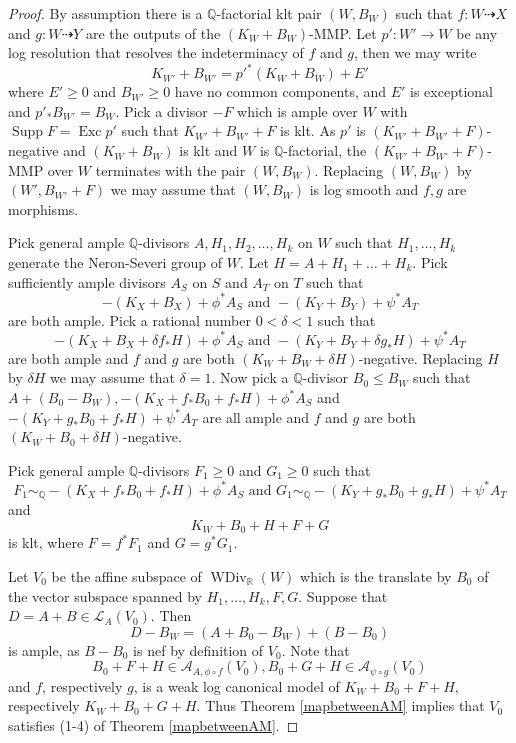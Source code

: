 \documentclass[11pt]{amsart}
\begin{document}
\begin{proof}
  By assumption there is a $\mathbb{Q}$-factorial klt pair $(W,B_{W})$ such that $f:W\dashrightarrow X$ and $g:W \dashrightarrow Y$ are the outputs of the $(K_{W}+B_{W})$-MMP. Let $p':W'\to W$ be any log resolution  that resolves the indeterminacy of $f$ and $g$, then we may write
  \[
    K_{W'}+B_{W'}=p'^*(K_{W}+B_{W})+E'
  \]
where $E'\geqslant 0$ and $B_{W'}\geqslant 0$ have no common components, and $E'$ is exceptional and $p'_*B_{W'}=B_{W}$. Pick a divisor $-F$ which is ample over $W$ with $\operatorname{Supp}F=\operatorname{Exc}p'$ such that $K_{W'}+B_{W'}+F$ is klt. As $p'$ is $(K_{W'}+
B_{W'}+F)$-negative and $(K_{W}+B_{W})$ is klt and $W$ is $\mathbb{Q}$-factorial, the $(K_{W'}+B_{W'}+F)$-MMP over $W$ terminates with the pair $(W,B_{W})$. Replacing $(W,B_{W})$ by $(W',B_{W'} +F)$ we may assume that $(W,B_{W})$ is log smooth and $f,g$ are morphisms.

Pick general ample $\mathbb{Q}$-divisors $A, H_{1},H_{2},\ldots ,H_{k}$ on $W$ such that $H_{1},\ldots , H_{k}$ generate the Neron-Severi group of $W$. Let $H=A+H_{1}+\ldots+ H_{k}$. Pick sufficiently ample divisors $A_{S}$ on $S$ and $A_{T}$ on $T$ such that
\[
-(K_{X}+B_{X})+\phi^*A_{S} \text{ and } -(K_{Y}+B_{Y})+\psi^*A_{T}
\]
are both ample. Pick a rational number $0<\delta<1$ such that 
\[
  -(K_{X}+B_{X}+\delta f_*H)+\phi^*A_{S} \text{ and } -(K_{Y}+B_{Y}+\delta g_*H)+\psi^*A_{T}
\]
are both ample and  $f$ and  $g$ are both  $(K_{W}+B_{W}+\delta H)$-negative. Replacing $H$ by $\delta H$ we may assume that $\delta=1$. Now pick a $\mathbb{Q}$-divisor $B_{0}\leqslant B_{W}$ such that $A+(B_{0}-B_{W}), -(K_{X}+ f_*B_{0}+f_*H)+\phi^*A_{S}$ and $-(K_{Y}+ g_*B_{0}+f_*H)+\psi^*A_{T}$  are all ample and $f$ and  $g$ are both  $(K_{W}+B_{0}+\delta H)$-negative.

Pick general ample $\mathbb{Q}$-divisors $F_{1}\geqslant 0$ and $G_{1}\geqslant 0$  such that
\[
F_{1}\sim_{\mathbb{Q}} -(K_{X}+f_*B_{0}+ f_*H)+\phi^*A_{S} \text{ and } G_{1}\sim_{\mathbb{Q}} -(K_{Y}+g_*B_{0}+ g_*H)+\psi^*A_{T}
\]
and 
\[
  K_{W}+B_{0}+H+F+G
\]
is klt, where $F=f^*F_{1}$ and $G=g^*G_{1}$. 

Let $V_{0}$ be the affine subspace of $\operatorname{WDiv}_{\mathbb{R}}(W)$ which is the translate by $B_{0}$ of the vector subspace  spanned by $H_{1},\ldots , H_{k},F,G$. Suppose that $D=A+B \in \mathcal{L}_{A}(V_{0})$. Then 
\[
  D-B_W=(A+B_{0}-B_{W})+(B-B_{0})
\]
is ample, as $B-B_{0}$ is nef by definition of $V_{0}$. Note that
\[
  B_{0}+F+H \in \mathcal{A}_{A,\phi\circ f}(V_{0}), B_{0}+G+H \in \mathcal{A}_{\psi \circ g}(V_{0})
\]
and $f$, respectively $g$, is a weak log canonical model of $K_{W}+B_{0}+F+H$, respectively $K_{W}+B_{0}+G+H$. Thus Theorem \ref{mapbetweenAM} implies that $V_{0}$ satisfies (1-4) of Theorem \ref{mapbetweenAM}.


\end{proof}
\end{document}
